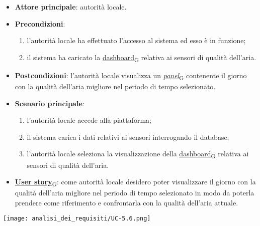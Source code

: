 \newpage

\begin{itemize}
	\item \textbf{Attore principale}: autorità locale.
	\item \textbf{Precondizioni}:
	      \begin{enumerate}
		      \item l'autorità locale ha effettuato l'accesso al sistema ed esso è in funzione;
		      \item il sistema ha caricato la \href{https://7last.github.io/docs/rtb/documentazione-interna/glossario\#dashboard}{dashboard\textsubscript{G}} relativa ai sensori di qualità dell'aria.
	      \end{enumerate}
	\item \textbf{Postcondizioni}: l'autorità locale visualizza un \href{https://7last.github.io/docs/rtb/documentazione-interna/glossario\#panel}{\textit{panel}\textsubscript{G}} contenente il giorno con la qualità dell'aria migliore nel periodo di tempo selezionato.
	\item \textbf{Scenario principale}:
	      \begin{enumerate}
		      \item l'autorità locale accede alla piattaforma;
		      \item il sistema carica i dati relativi ai sensori interrogando il database;
		      \item l'autorità locale seleziona la visualizzazione della \href{https://7last.github.io/docs/rtb/documentazione-interna/glossario\#dashboard}{dashboard\textsubscript{G}} relativa ai sensori di qualità dell'aria.
	      \end{enumerate}
	\item \href{https://7last.github.io/docs/rtb/documentazione-interna/glossario\#user-story}{\textbf{User story}\textsubscript{G}}:
	      come autorità locale desidero poter visualizzare il giorno con la qualità dell'aria migliore nel periodo di tempo selezionato
	      in modo da poterla prendere come riferimento e confrontarla con la qualità dell'aria attuale.
\end{itemize}
\begin{center}
	\texttt{[image: analisi\_dei\_requisiti/UC-5.6.png]}
\end{center}

